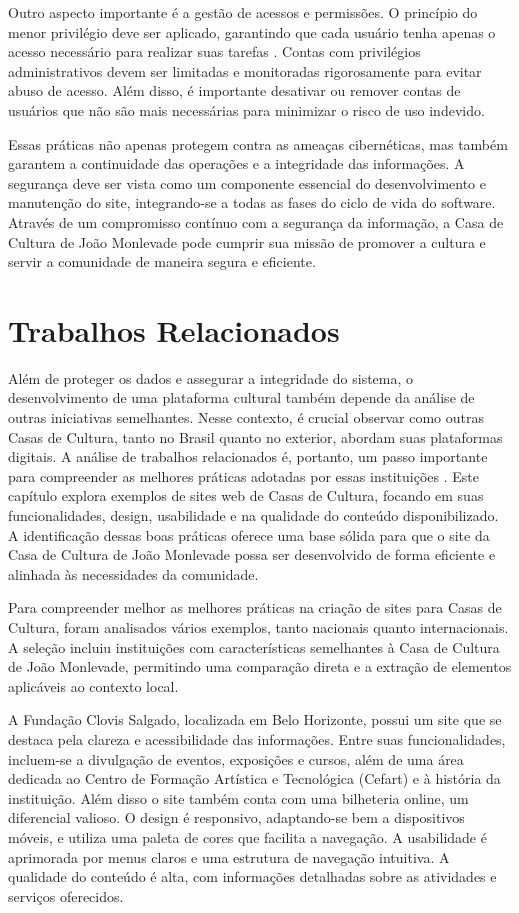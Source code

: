 Outro aspecto importante é a gestão de acessos e permissões. O princípio do menor privilégio deve ser aplicado, garantindo que cada usuário tenha apenas o acesso necessário para realizar suas tarefas \cite{schneider2003least}. Contas com privilégios administrativos devem ser limitadas e monitoradas rigorosamente para evitar abuso de acesso. Além disso, é importante desativar ou remover contas de usuários que não são mais necessárias para minimizar o risco de uso indevido.

Essas práticas não apenas protegem contra as ameaças cibernéticas, mas também garantem a continuidade das operações e a integridade das informações. A segurança deve ser vista como um componente essencial do desenvolvimento e manutenção do site, integrando-se a todas as fases do ciclo de vida do software. Através de um compromisso contínuo com a segurança da informação, a Casa de Cultura de João Monlevade pode cumprir sua missão de promover a cultura e servir a comunidade de maneira segura e eficiente.

\section{Trabalhos Relacionados}

Além de proteger os dados e assegurar a integridade do sistema, o desenvolvimento de uma plataforma cultural também depende da análise de outras iniciativas semelhantes. Nesse contexto, é crucial observar como outras Casas de Cultura, tanto no Brasil quanto no exterior, abordam suas plataformas digitais. A análise de trabalhos relacionados é, portanto, um passo importante para compreender as melhores práticas adotadas por essas instituições \cite{boud2003learning}. Este capítulo explora exemplos de sites web de Casas de Cultura, focando em suas funcionalidades, design, usabilidade e na qualidade do conteúdo disponibilizado. A identificação dessas boas práticas oferece uma base sólida para que o site da Casa de Cultura de João Monlevade possa ser desenvolvido de forma eficiente e alinhada às necessidades da comunidade.

Para compreender melhor as melhores práticas na criação de sites para Casas de Cultura, foram analisados vários exemplos, tanto nacionais quanto internacionais. A seleção incluiu instituições com características semelhantes à Casa de Cultura de João Monlevade, permitindo uma comparação direta e a extração de elementos aplicáveis ao contexto local.

A Fundação Clovis Salgado, localizada em Belo Horizonte, possui um site que se destaca pela clareza e acessibilidade das informações. Entre suas funcionalidades, incluem-se a divulgação de eventos, exposições e cursos, além de uma área dedicada ao Centro de Formação Artística e Tecnológica (Cefart) e à história da instituição. Além disso o site também conta com uma bilheteria online, um diferencial valioso. O design é responsivo, adaptando-se bem a dispositivos móveis, e utiliza uma paleta de cores que facilita a navegação. A usabilidade é aprimorada por menus claros e uma estrutura de navegação intuitiva. A qualidade do conteúdo é alta, com informações detalhadas sobre as atividades e serviços oferecidos.

